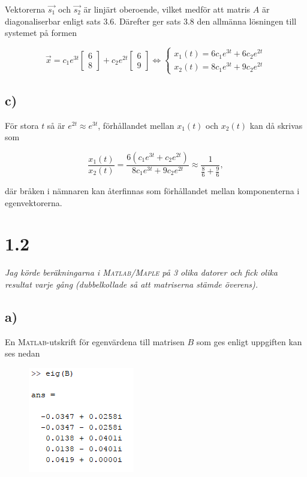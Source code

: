 \documentclass[a4paper]{article}
\newcommand{\mat}[1]{\bm{\mathit{#1}}}
\begin{document}
\noindent Vektorerna $\vec{s_1}$ och $\vec{s_2}$ är linjärt oberoende, vilket
medför att matris $\mat{A}$ är diagonaliserbar enligt sats 3.6. Därefter ger
sats 3.8 den allmänna lösningen till systemet på formen

\begin{equation*}
  \vec{x} = c_1e^{3t}\begin{bmatrix}6\\8\end{bmatrix} + c_2e^{2t}\begin{bmatrix}6\\9\end{bmatrix}
  \iff \begin{cases}
    x_1(t) = 6c_1e^{3t} + 6c_2e^{2t}\\
    x_2(t) = 8c_1e^{3t} + 9c_2e^{2t}
    \end{cases}
\end{equation*}

\subsection*{c)}

För stora $t$ så är $e^{2t} \approx e^{3t}$, förhållandet mellan $x_1(t)$ och
$x_2(t)$ kan då skrivas som

\begin{equation*}
  \frac{x_1(t)}{x_2(t)} = \frac{6(c_1e^{3t} + c_2e^{2t})}{8c_1e^{3t} + 9c_2e^{2t}} \approx \frac{1}{\frac 86 + \frac 96},
\end{equation*}

\noindent där bråken i nämnaren kan återfinnas som förhållandet mellan
komponenterna i egenvektorerna.

\section*{1.2}

\emph{Jag körde beräkningarna i \textsc{Matlab}/\textsc{Maple} på 3 olika datorer och fick olika resultat varje gång (dubbelkollade så att matriserna stämde överens).}

\subsection*{a)}

En \textsc{Matlab}-utskrift för egenvärdena till matrisen $\mat{B}$ som ges enligt
uppgiften kan ses nedan

\FloatBarrier
\begin{figure}[h!]
  \centering
  \includegraphics[width=0.35\linewidth]{figurer/matlab_1_2_a.png}
\end{figure}
\FloatBarrier
\end{document}
